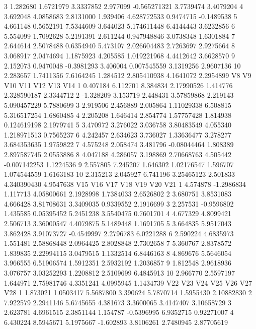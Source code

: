 \documentclass[12pt]{article}
\begin{document}
\begin{Schunk}
\begin{Soutput}
3  1.282680 1.6721979  3.3337852 2.977099 -0.565271321 3.7739474  3.4079204
4  3.692048 4.0858683  2.8131000 1.939406  4.628772533 0.9474715 -0.1489538
5  4.661148 0.5652191  7.5344609 3.644023  5.174611448 6.4144443  3.6232856
6  5.554099 1.7092628  5.2191391 2.611244  0.947948846 3.0738348  1.6301884
7  2.644614 2.5078488  0.6354940 5.473107  2.026604483 2.7263697  2.9275664
8  3.068917 2.0474694  1.1875923 4.205585  1.019221968 4.4412642  3.6628570
9  2.152073 0.9470048 -0.3981293 3.406004  0.007545559 3.1319256  2.9607136
10 2.283657 1.7411356  7.6164245 1.284512  2.805410938 4.1641072  2.2954899
          V8       V9      V10         V11      V12          V13       V14
1   0.407184 6.112701 8.384834  2.17990526 1.414776  2.328590187 2.3344712
2  -1.328209 3.153719 2.448431  3.57859868 2.219143  5.090457229 5.7880699
3   2.919506 2.456889 2.005864  1.11029338 6.508815  5.316517254 1.6860485
4   2.205208 1.646414 2.854774  1.57757428 1.814938  0.124619198 2.1979741
5   3.470972 3.276022 3.036758  3.80483549 4.055340  1.218971513 0.7565237
6   4.242457 2.634623 3.736027  1.33636477 3.278277  3.684353635 1.9759822
7   4.575248 2.058474 3.481796 -0.08044464 1.808389  2.897587745 2.0553886
8   4.047188 4.286057 3.198869  2.70668763 4.505442 -0.007142253 1.1224536
9   2.557805 7.245207 1.646302  1.02176547 1.596707  1.074544559 1.6163183
10  2.315213 2.045927 6.741196  3.25465123 2.501833  4.340390430 4.9547638
        V15        V16      V17        V18        V19       V20       V21
1  4.574878 -1.2986834 1.117713 4.05800661  2.1928998 1.7384033 2.6526802
2  3.680751  3.8531083 4.666428 3.81708631  3.3409035 0.9339552 2.1916699
3  2.257531 -0.9596802 1.435585 0.05395452  5.2451238 3.5540475 0.7601701
4  4.677329  4.8099421 2.506713 3.36000547  4.4079875 5.1489448 1.1691705
5  3.664835  5.9517043 3.862428 3.91073727 -0.4549997 2.2796783 6.0221288
6  2.590224  4.6835973 1.551481 2.58868448  2.0964425 2.8028848 2.7302658
7  5.360767  2.8378572 1.839835 2.22994115  3.0479515 1.1332514 6.8446163
8  4.869676  5.5646054 3.966555 6.51906574  1.5912351 2.5932192 1.2036857
9  1.812548  2.9618936 3.076757 3.03252293  1.2208812 2.5109699 6.4845913
10 2.966770  2.5597197 1.644971 2.75981746  4.3351241 4.0995945 1.1434739
         V22        V23       V24       V25        V26       V27         V28
1   1.873021  1.0503417 5.5687800  3.390624  5.7870714 1.5955430  2.10882830
2   7.922579  2.2941146 5.6745655  4.381673  3.3600065 3.4147407  3.10658729
3   2.623781  4.6961515 2.3851144  1.154787 -0.5396995 6.9352715  0.92271007
4   6.430224  8.5945671 5.1975667 -1.602893  3.8106261 2.7480945  2.87705619

\end{Soutput}
\end{Schunk}
\end{document}
